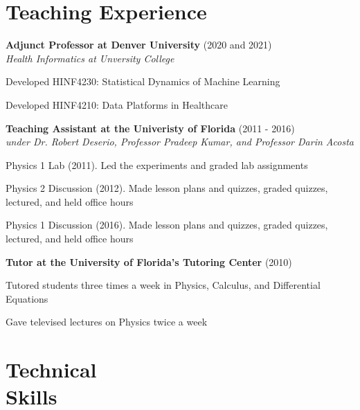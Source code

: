 \begin{resume}
    \section{\mysidestyle Teaching Experience}
    {\bf Adjunct Professor at Denver University} (2020 and 2021)\\\vspace{2mm}%
    \textit{Health Informatics at Unversity College}
    \begin{stuff}
        \vspace*{1mm}
                \item Developed HINF4230: Statistical Dynamics of Machine Learning
                \item Developed HINF4210: Data Platforms in Healthcare
    \end{stuff}
    {\bf Teaching Assistant at the Univeristy of Florida} (2011 - 2016)\\\vspace{2mm}%
    \textit{under Dr. Robert Deserio, Professor Pradeep Kumar, and Professor Darin Acosta}
    \begin{stuff}
        \vspace*{1mm}
                \item Physics 1 Lab (2011). Led the experiments and graded lab assignments
                \item Physics 2 Discussion (2012). Made lesson plans and quizzes, graded quizzes, lectured, and held office hours
                \item Physics 1 Discussion (2016). Made lesson plans and quizzes, graded quizzes, lectured, and held office hours
    \end{stuff}
    \vspace{2mm}
    {\bf Tutor at the University of Florida's Tutoring Center} (2010)\\\vspace{-2mm}%
    \begin{stuff}
        \vspace*{1mm}
                \item Tutored students three times a week in Physics, Calculus, and Differential Equations
                \item Gave televised lectures on Physics twice a week
    \end{stuff}

    \section{\mysidestyle Technical\\Skills}
    

\end{resume}
